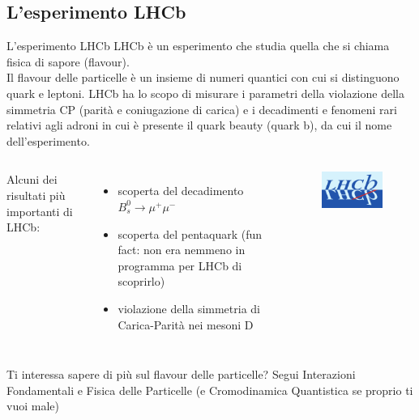 \documentclass[
10pt,
aspectratio=169,
]{beamer}
\begin{document}
\subsection{L'esperimento LHCb}
\begin{frame}{L'esperimento LHCb}
LHCb è un esperimento che studia quella che si chiama  fisica di sapore (flavour).\\
Il flavour delle particelle è un insieme di numeri quantici con cui si distinguono quark e leptoni.
\vfill
LHCb ha lo scopo di misurare i parametri della violazione della simmetria CP (parità e coniugazione di carica) e i decadimenti e fenomeni rari relativi agli adroni in cui è presente il quark beauty (quark b), da cui il nome dell'esperimento.  
\vfill
\begin{columns}
    Alcuni dei risultati più importanti di LHCb:
\begin{itemize}
    \item scoperta del decadimento ${\displaystyle B_{s}^{0}\to \mu ^{+}\mu ^{-}}$
\item scoperta del pentaquark (fun fact: non era nemmeno in programma per LHCb di scoprirlo)
\item violazione della simmetria di Carica-Parità nei mesoni D 
\end{itemize}
    \begin{figure}
        \centering
        \includegraphics[width=\textwidth]{figures/Lhcb-logo-new.png}
    \end{figure}
\end{columns}
\vfill
Ti interessa sapere di più sul flavour delle particelle? Segui Interazioni Fondamentali e Fisica delle Particelle (e Cromodinamica Quantistica se proprio ti vuoi male)
\end{frame}
\end{document}
